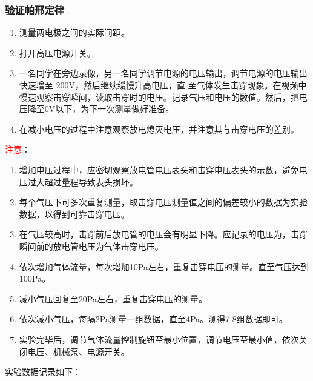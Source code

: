 \documentclass[dvipsnames, svgnames,a4paper,11pt]{article}
\begin{document}
	\subsubsection{验证帕邢定律}
	\begin{enumerate}
		\item 测量两电极之间的实际间距。
		\item 打开高压电源开关。
		\item 一名同学在旁边录像，另一名同学调节电源的电压输出，调节电源的电压输出快速增至 200V，然后继续缓慢升高电压，直
		至气体发生击穿现象。在视频中慢速观察击穿瞬间，读取击穿时的电压。记录气压和电压的数值。然后，把电压降至0V以下，为下一次测量做好准备。
		\item 在减小电压的过程中注意观察放电熄灭电压，并注意其与击穿电压的差别。
	\end{enumerate}
	\textcolor{red}{注意}：
\begin{enumerate}
	\item 增加电压过程中，应密切观察放电管电压表头和击穿电压表头的示数，避免电压过大超过量程导致表头损坏。
	\item 每个气压下可多次重复测量，取击穿电压测量值之间的偏差较小的数据为实验数据，以得到可靠击穿电压。
	\item 在气压较高时，击穿前后放电管的电压会有明显下降。应记录的电压为，击穿瞬间前的放电管电压为气体击穿电压。
	\item 依次增加气体流量，每次增加10Pa左右，重复击穿电压的测量。直至气压达到100Pa。
	\item 减小气压回复至20Pa左右，重复击穿电压的测量。 
	\item 依次减小气压，每隔2Pa测量一组数据，直至4Pa。测得7-8组数据即可。
	\item 实验完毕后，调节气体流量控制旋钮至最小位置，调节电压至最小值，依次关闭电压、机械泵、电源开关。 
\end{enumerate}
实验数据记录如下：
\end{document}

